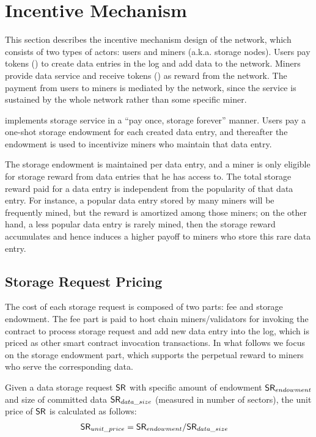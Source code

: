 
\section{Incentive Mechanism}

This section describes the incentive mechanism design of the \project network, which consists of two types of actors: users and miners (a.k.a. storage nodes).
Users pay tokens (\token) to create data entries in the log and add data to the network.
Miners provide data service and receive tokens (\token) as reward from the network.
The payment from users to miners is mediated by the \project network,
since the service is sustained by the whole network rather than some specific miner.

\project implements storage service in a ``pay once, storage forever'' manner.
Users pay a one-shot storage endowment for each created data entry, and thereafter the endowment is used to incentivize miners who maintain that data entry.


The storage endowment is maintained per data entry,
and a miner is only eligible for storage reward from data entries that he has access to.
The total storage reward paid for a data entry is independent from the popularity of that data entry.
For instance, a popular data entry stored by many miners will be frequently mined, but the reward is amortized among those miners;
on the other hand, a less popular data entry is rarely mined, 
then the storage reward accumulates and hence induces a higher payoff to miners who store this rare data entry.



\subsection{Storage Request Pricing}

The cost of each \project storage request is composed of two parts: fee and storage endowment.
The fee part is paid to host chain miners/validators for invoking the \project contract to process storage request and add new data entry into the log, which is priced as other smart contract invocation transactions.
In what follows we focus on the storage endowment part, 
which supports the perpetual reward to \project miners who serve the corresponding data.

Given a data storage request $\mathsf{SR}$ with specific amount of endowment $\mathsf{SR}_{endowment}$ and size of committed data $\mathsf{SR}_{data\_size}$ (measured in number of \sectorsize sectors),
the unit price of $\mathsf{SR}$ is calculated as follows:
\begin{align}
	\mathsf{SR}_{unit\_price} &= \mathsf{SR}_{endowment}/\mathsf{SR}_{data\_size}
\end{align}

